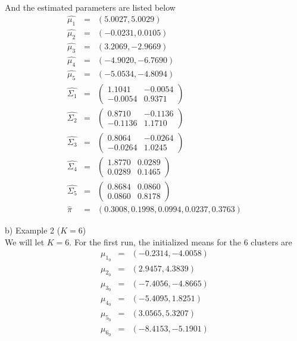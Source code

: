 \documentclass[12pt]{article}
\begin{document}
And the estimated parameters are listed below
\begin{eqnarray*}
\hat{\mu_1} &=& (5.0027,    5.0029) \\
\hat{\mu_2} &=& (-0.0231,    0.0105) \\
\hat{\mu_3} &=& (3.2069,   -2.9669) \\
\hat{\mu_4} &=& (-4.9020,   -6.7690) \\
\hat{\mu_5} &=& (-5.0534,   -4.8094) \\
\hat{\Sigma_1} &=&
  \begin{pmatrix}
    1.1041  & -0.0054 \\
   -0.0054  &  0.9371
  \end{pmatrix} \\
\hat{\Sigma_2} &=& 
  \begin{pmatrix}
    0.8710  & -0.1136 \\
   -0.1136  &  1.1710
  \end{pmatrix} \\
\hat{\Sigma_3} &=&
  \begin{pmatrix}
    0.8064  & -0.0264 \\
   -0.0264  &  1.0245
  \end{pmatrix} \\
\hat{\Sigma_4} &=& 
  \begin{pmatrix}
    1.8770  &  0.0289 \\
    0.0289  &  0.1465
  \end{pmatrix} \\
\hat{\Sigma_5} &=& 
  \begin{pmatrix}
    0.8684  &  0.0860 \\
    0.0860  &  0.8178
  \end{pmatrix} \\
\hat{\pi} &=& ( 0.3008, 0.1998, 0.0994, 0.0237, 0.3763)
\end{eqnarray*}

b) Example 2 ($K = 6$) \\

We will let $K = 6$. For the first run, the initialized means for the 6 clusters are
\begin{eqnarray*}
\mu_{1_0} &=& (-0.2314,   -4.0058) \\
\mu_{2_0} &=& (2.9457,    4.3839) \\
\mu_{3_0} &=& (-7.4056,   -4.8665) \\
\mu_{4_0} &=& (-5.4095,    1.8251) \\
\mu_{5_0} &=& (3.0565,    5.3207) \\
\mu_{6_0} &=& (-8.4153,   -5.1901)
\end{eqnarray*}
\end{document}
